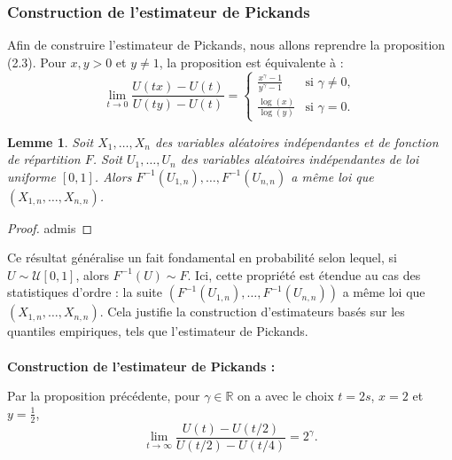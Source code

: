 \documentclass{article}
\theoremstyle{plain}
\theoremstyle{definition}
\theoremstyle{plain}
\newtheorem{lemma}[definition]{Lemme}
\begin{document}
\subsubsection{Construction de l'estimateur de Pickands}

Afin de construire l'estimateur de Pickands, nous allons reprendre la proposition (2.3). Pour \(x,y > 0\) et \(y \neq 1\), la proposition est équivalente à :
\[
\lim_{t \to 0} \frac{U(tx) - U(t)}{U(ty) - U(t)} = 
\begin{cases} 
\frac{x^\gamma - 1}{y^\gamma - 1} & \text{si } \gamma \neq 0, \\
\frac{\log(x)}{\log(y)} & \text{si } \gamma = 0.
\end{cases}
\]
\newline

\begin{lemma}
Soit \(X_1, \dots, X_n\) des variables aléatoires indépendantes et de fonction de répartition \(F\).
Soit \(U_1, \dots, U_n\) des variables aléatoires indépendantes de loi uniforme \(\left[0,1\right]\). Alors \(F^{-1}(U_{1,n}), \dots, F^{-1}(U_{n,n})\) a même loi que \((X_{1,n}, \dots, X_{n,n})\).
\end{lemma}

\begin{proof}
admis
\end{proof}
\noindent
Ce résultat généralise un fait fondamental en probabilité selon lequel, si \(U \sim \mathcal{U}[0,1]\), alors \(F^{-1}(U) \sim F\). Ici, cette propriété est étendue au cas des statistiques d'ordre : la suite \((F^{-1}(U_{1,n}), \dots, F^{-1}(U_{n,n}))\) a même loi que \((X_{1,n}, \dots, X_{n,n})\). Cela justifie la construction d’estimateurs basés sur les quantiles empiriques, tels que l’estimateur de Pickands.
\\
\\
\noindent \textbf{Construction de l'estimateur de Pickands :}

Par la proposition précédente, pour $\gamma \in \mathbb{R}$ on a avec le choix $t = 2s$, $x = 2$ et $y = \frac{1}{2}$,
\[
\lim_{t \to \infty} \frac{U(t) - U(t/2)}{U(t/2) - U(t/4)} = 2^{\gamma}.
\]
\end{document}
